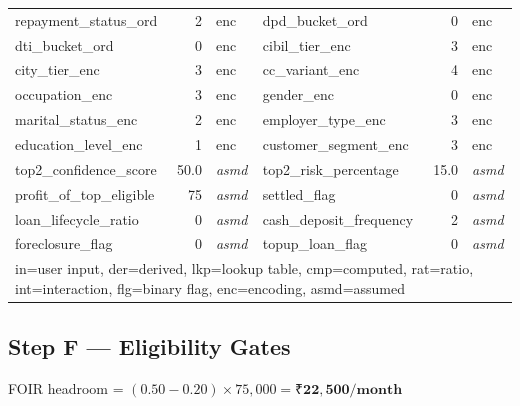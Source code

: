\documentclass[12pt,a4paper]{article}
\begin{document}
\begin{longtable}{lrl|lrl}
repayment\_status\_ord & 2 & enc & dpd\_bucket\_ord & 0 & enc \\
dti\_bucket\_ord & 0 & enc & cibil\_tier\_enc & 3 & enc \\
city\_tier\_enc & 3 & enc & cc\_variant\_enc & 4 & enc \\
occupation\_enc & 3 & enc & gender\_enc & 0 & enc \\
marital\_status\_enc & 2 & enc & employer\_type\_enc & 3 & enc \\
education\_level\_enc & 1 & enc & customer\_segment\_enc & 3 & enc \\
\midrule
top2\_confidence\_score & 50.0 & \textit{asmd} & top2\_risk\_percentage & 15.0 & \textit{asmd} \\
profit\_of\_top\_eligible & 75 & \textit{asmd} & settled\_flag & 0 & \textit{asmd} \\
loan\_lifecycle\_ratio & 0 & \textit{asmd} & cash\_deposit\_frequency & 2 & \textit{asmd} \\
foreclosure\_flag & 0 & \textit{asmd} & topup\_loan\_flag & 0 & \textit{asmd} \\
\bottomrule
\multicolumn{6}{l}{\small in=user input, der=derived, lkp=lookup table, cmp=computed, rat=ratio, int=interaction, flg=binary flag, enc=encoding, asmd=assumed}
\end{longtable}

\subsection{Step F — Eligibility Gates}

FOIR headroom = $(0.50-0.20)\times75{,}000 = \mathbf{₹22{,}500/\text{month}}$
\end{document}
